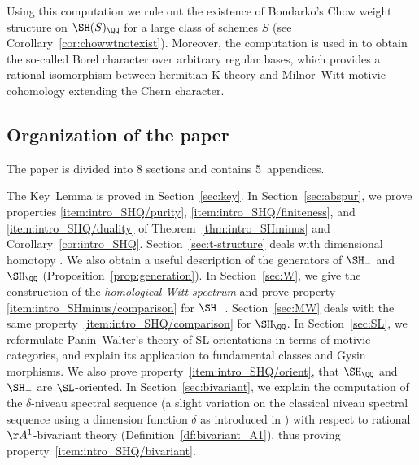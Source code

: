 Using this computation we rule out the existence of Bondarko's Chow weight structure on $\SH(S)_\QQ$ for a large class of schemes $S$ (see Corollary~\ref{cor:chowwtnotexist}).
Moreover, the computation is used in \cite{DF3} to obtain
the so-called Borel character over arbitrary regular bases, which provides
a rational isomorphism between hermitian K-theory and Milnor--Witt motivic cohomology extending the Chern character.

\subsection*{Organization of the paper}

The paper is divided into 8 sections and contains 5~appendices.

The Key~Lemma is proved in Section~\ref{sec:key}.
In Section~\ref{sec:abspur}, we prove properties \eqref{item:intro_SHQ/purity}, \eqref{item:intro_SHQ/finiteness}, and \eqref{item:intro_SHQ/duality} of Theorem~\ref{thm:intro_SHminus} and Corollary~\ref{cor:intro_SHQ}.
Section~\ref{sec:t-structure} deals with dimensional homotopy \tstructures.
We also obtain a useful description of the generators of $\SH_-$ and $\SH_\QQ$ (Proposition~\ref{prop:generation}).
In Section~\ref{sec:W}, we give the construction of the \emph{homological Witt spectrum} and prove property \eqref{item:intro_SHminus/comparison} for $\SH_-$.
Section~\ref{sec:MW} deals with the same property~\eqref{item:intro_SHQ/comparison} for $\SH_\QQ$.
In Section~\ref{sec:SL}, we reformulate Panin--Walter's theory of SL-orientations in terms of motivic categories, and explain its application to fundamental classes and Gysin morphisms.
We also prove property~\eqref{item:intro_SHQ/orient}, \ie that $\SH_\QQ$ and $\SH_-$ are $\SL$-oriented.
In Section~\ref{sec:bivariant}, we explain the computation of the $\delta$-niveau spectral sequence (a slight variation on the classical niveau spectral sequence using a dimension function $\delta$
as introduced in \cite{BD1}) with respect to rational $\AA^1$-bivariant theory (Definition~\ref{df:bivariant_A1}), thus proving property~\eqref{item:intro_SHQ/bivariant}.


